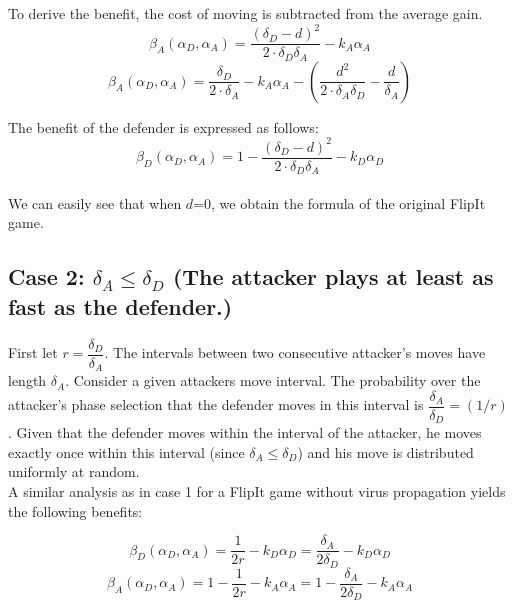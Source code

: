\documentclass[master=cws, masteroption=vs]{kulemt}
\begin{document}
\begin{abstract*}
To derive the benefit, the cost of moving is subtracted from the average gain. 
\begin{equation}\label{first}
\beta_{A}(\alpha_{D},\alpha_{A}) = \dfrac { (\delta_{D}-d) ^{2}} {2 \cdot \delta_{D}  \delta_{A}} - k_{A} \alpha_{A}
\end{equation}
\begin{equation}\label{first}
\beta_{A}(\alpha_{D},\alpha_{A}) = \dfrac { \delta_{D}} {2 \cdot \delta_{A}} - k_{A} \alpha_{A} - ( \dfrac{d^{2}}{2 \cdot \delta_{A} \delta_{D}} - \dfrac{d}{\delta_{A}} )
\end{equation}
 
 
 The benefit of the defender is expressed as follows:
 \begin{equation}\label{first}
\beta_{D}(\alpha_{D},\alpha_{A}) = 1 - \dfrac { (\delta_{D}-d) ^{2}} {2 \cdot \delta_{D}  \delta_{A}} - k_{D} \alpha_{D}
\end{equation}
~~\\
We can easily see that when $d$=0, we obtain the formula of the original FlipIt game.\\


\subsection*{\textbf{Case 2:} $\delta_{A} \leq \delta_{D} $ (The attacker plays at least as fast as the defender.) }

First let $r = \dfrac{\delta_{D}}{ \delta_{A} }$. The intervals between two consecutive attacker's moves have length $\delta_{A}$. Consider a given attackers move interval. The probability over the attacker's phase selection that the defender moves in this interval is $\dfrac{\delta_{A}}{ \delta_{D} } = (1/r)$. Given that the defender moves within the interval of the attacker, he moves exactly once within this interval (since $\delta_{A} \leq \delta_{D} $) and his move is distributed uniformly at random. \\

A similar analysis as in case 1 for a FlipIt game without virus propagation yields the following benefits:

\begin{equation}\label{first}
\beta_{D}(\alpha_{D},\alpha_{A}) = \dfrac {1} {2r} - k_{D} \alpha_{D} = \dfrac {\delta_{A}} {2\delta_{D}} - k_{D} \alpha_{D} 
\end{equation}
\begin{equation}\label{first}
\beta_{A}(\alpha_{D},\alpha_{A}) =1 - \dfrac {1} {2r} - k_{A} \alpha_{A} = 1- \dfrac {\delta_{A}} {2\delta_{D}} - k_{A} \alpha_{A}  
\end{equation}\\



\end{abstract*}
\end{document}

